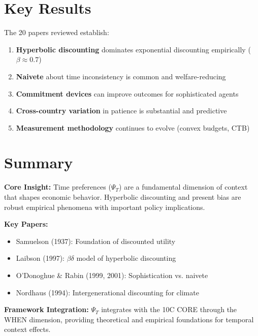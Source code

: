 \section{Key Results}
\label{sec:ctm-results}

The 20 papers reviewed establish:

\begin{enumerate}
    \item \textbf{Hyperbolic discounting} dominates exponential discounting empirically ($\beta \approx 0.7$)
    \item \textbf{Naivete} about time inconsistency is common and welfare-reducing
    \item \textbf{Commitment devices} can improve outcomes for sophisticated agents
    \item \textbf{Cross-country variation} in patience is substantial and predictive
    \item \textbf{Measurement methodology} continues to evolve (convex budgets, CTB)
\end{enumerate}


\section{Summary}
\label{sec:ctm-summary}

\begin{tcolorbox}[colback=gray!5!white, colframe=gray!75!black,
    title=Appendix UNMAPPED_CTM Summary: Temporal Context]

\textbf{Core Insight:}
Time preferences ($\Psi_T$) are a fundamental dimension of context that shapes economic behavior. Hyperbolic discounting and present bias are robust empirical phenomena with important policy implications.

\textbf{Key Papers:}
\begin{itemize}[nosep]
    \item Samuelson (1937): Foundation of discounted utility
    \item Laibson (1997): $\beta\delta$ model of hyperbolic discounting
    \item O'Donoghue \& Rabin (1999, 2001): Sophistication vs. naivete
    \item Nordhaus (1994): Intergenerational discounting for climate
\end{itemize}

\textbf{Framework Integration:}
$\Psi_T$ integrates with the 10C CORE through the WHEN dimension, providing theoretical and empirical foundations for temporal context effects.

\end{tcolorbox}


